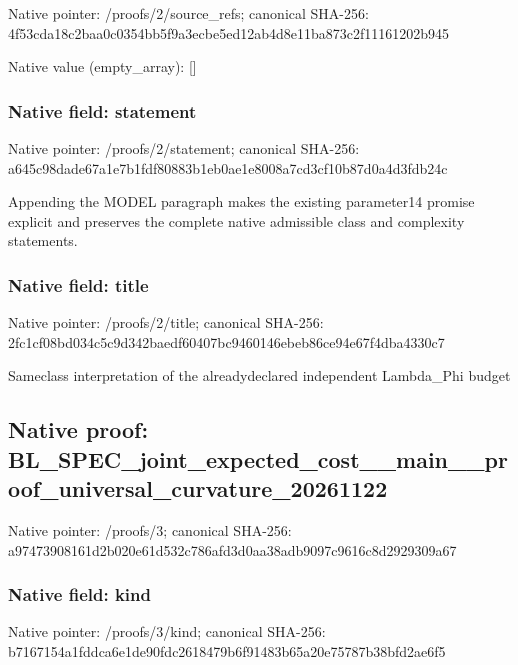 \documentclass[10pt,a4paper]{article}
\begin{document}
Native pointer: /proofs/2/source\_refs; canonical SHA-256: 4f53cda18c2baa0c0354bb5f\allowbreak{}9a3ecbe5ed12ab4d8e11ba87\allowbreak{}3c2f11161202b945



Native value (empty\_array): []



\subsubsection{Native field: statement}


Native pointer: /proofs/2/statement; canonical SHA-256: a645c98dade67a1e7b1fdf80\allowbreak{}883b1eb0ae1e8008a7cd3cf1\allowbreak{}0b87d0a4d3fdb24c


Appending the MODEL paragraph makes the existing parameter14 promise explicit and preserves the complete native admissible class and complexity statements.


\subsubsection{Native field: title}


Native pointer: /proofs/2/title; canonical SHA-256: 2fc1cf08bd034c5c9d342bae\allowbreak{}df60407bc9460146ebeb86ce\allowbreak{}94e67f4dba4330c7


Sameclass interpretation of the alreadydeclared independent Lambda\_Phi budget


\subsection{Native proof: BL\_SPEC\_joint\_expected\_c\allowbreak{}ost\_\_main\_\_proof\_univers\allowbreak{}al\_curvature\_20261122}


Native pointer: /proofs/3; canonical SHA-256: a97473908161d2b020e61d53\allowbreak{}2c786afd3d0aa38adb9097c9\allowbreak{}616c8d2929309a67



\subsubsection{Native field: kind}


Native pointer: /proofs/3/kind; canonical SHA-256: b7167154a1fddca6e1de90fd\allowbreak{}c2618479b6f91483b65a20e7\allowbreak{}5787b38bfd2ae6f5
\end{document}

